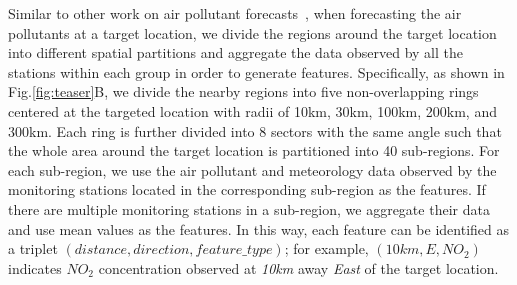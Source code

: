 Similar to other work on air pollutant forecasts~\cite{zheng2015forecasting}, when forecasting the air pollutants at a target location, we divide the regions around the target location into different spatial partitions and aggregate the data observed by all the stations within each group in order to generate features.
Specifically, as shown in Fig.\ref{fig:teaser}B, we divide the nearby regions into five non-overlapping rings centered at the targeted location with radii of 10km, 30km, 100km, 200km, and 300km.
Each ring is further divided into 8 sectors with the same angle such that the whole area around the target location is partitioned into 40 sub-regions. 
For each sub-region, we use the air pollutant and meteorology data observed by the monitoring stations located in the corresponding sub-region as the features.
If there are multiple monitoring stations in a sub-region, we aggregate their data and use mean values as the features.
In this way, each feature can be identified as a triplet $(distance, direction, feature\_type)$; for example, $(10km, E, NO_{2})$ indicates $NO_{2}$ concentration observed at \textit{10km} away \textit{East} of the target location. 

